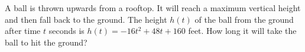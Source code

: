\vfill
\begin{center}\hfill
\end{center}

\begin{exercise}
	A ball is thrown upwards from a rooftop. It will reach a maximum vertical height and then fall back to the ground. The height $h(t)$ of the ball from the ground after time $t$ seconds is $h(t)=-16t^2 + 48t + 160$ feet. How long it will take the ball to hit the ground?
\end{exercise}

\vfill
\begin{center}\hfill
\end{center}





